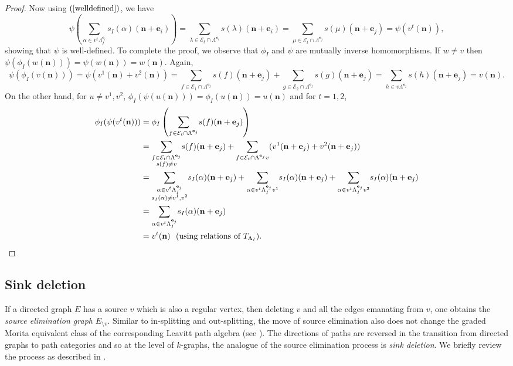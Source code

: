\documentclass[12pt]{amsart}
\newcommand{\N}{\mathbf{n}}
\theoremstyle{definition}
\theoremstyle{remark}
\begin{document}
\begin{proof}
Now using $(\ref{welldefined})$, we have \[\psi\left(\displaystyle{\sum_{\alpha\in v^t\Lambda_I^{\mathbf{e}_i}}} s_I(\alpha)(\N+\mathbf{e}_i)\right)=\displaystyle{\sum_{\lambda\in \mathcal{E}_t\cap \Lambda^{\mathbf{e}_i}}} s(\lambda)(\N+\mathbf{e}_i)=\displaystyle{\sum_{\mu\in \mathcal{E}_t\cap \Lambda^{\mathbf{e}_j}}} s(\mu)(\N+\mathbf{e}_j)=\psi(v^t(\N)),\] showing that $\psi$ is well-defined. To complete the proof, we observe that $\phi_I$ and $\psi$ are mutually inverse homomorphisms. If $w\neq v$ then $\psi(\phi_I(w(\N)))=\psi(w(\N))=w(\N)$. Again, \[\psi(\phi_I(v(\N)))=\psi(v^1(\N)+v^2(\N))=\displaystyle{\sum_{f\in \mathcal{E}_1\cap \Lambda^{\mathbf{e}_j}}} s(f)(\N+\mathbf{e}_j)+\displaystyle{\sum_{g\in \mathcal{E}_2\cap \Lambda^{\mathbf{e}_j}}} s(g)(\N+\mathbf{e}_j)=\displaystyle{\sum_{h\in v\Lambda^{\mathbf{e}_j}}} s(h)(\N+\mathbf{e}_j)=v(\N).\] On the other hand, for $u\neq v^1,v^2$, $\phi_I(\psi(u(\N)))=\phi_I(u(\N))=u(\N)$ and for $t=1,2$,
{\allowdisplaybreaks
\begin{align*}
\phi_I(\psi(v^t(\N)))&=\phi_I\left(\displaystyle{\sum_{f\in \mathcal{E}_t\cap \Lambda^{\mathbf{e}_j}}} s(f)(\N+\mathbf{e}_j)\right)\\
&= \displaystyle{\sum_{\substack{f\in \mathcal{E}_t\cap \Lambda^{\mathbf{e}_j}\\s(f)\neq v}}} s(f)(\N+\mathbf{e}_j)+\displaystyle{\sum_{f\in \mathcal{E}_t\cap \Lambda^{\mathbf{e}_j}v}} (v^1(\N+\mathbf{e}_j)+v^2(\N+\mathbf{e}_j))\\
&= \displaystyle{\sum_{\substack{\alpha\in v^t\Lambda_I^{\mathbf{e}_j}\\s_I(\alpha)\neq v^1,v^2}}} s_I(\alpha)(\N+\mathbf{e}_j)+\displaystyle{\sum_{\alpha\in v^t\Lambda_I^{\mathbf{e}_j}v^1}} s_I(\alpha)(\N+\mathbf{e}_j)+\displaystyle{\sum_{\alpha\in v^t\Lambda_I^{\mathbf{e}_j}v^2}} s_I(\alpha)(\N+\mathbf{e}_j)\\
&= \displaystyle{\sum_{\alpha\in v^t\Lambda_I^{\mathbf{e}_j}}} s_I(\alpha)(\N+\mathbf{e}_j)\\
&= v^t(\N)~~(\text{using relations of}~T_{\Lambda_I}).\qedhere
\end{align*}
}
\end{proof}

\subsection{Sink deletion}\label{ssec sink deletion}
If a directed graph $E$ has a source $v$ which is also a regular vertex, then deleting $v$ and all the edges emanating from $v$, one obtains the \emph{source elimination graph} $E_{\setminus v}$. Similar to in-splitting and out-splitting, the move of source elimination also does not change the graded Morita equivalent class of the corresponding Leavitt path algebra (see \cite[Proposition 13]{Hazrat-main}). The directions of paths are reversed in the transition from directed graphs to path categories and so at the level of $k$-graphs, the  analogue of the source elimination process is \emph{sink deletion}. We briefly review the process as described in \cite[Section 5]{EFGGGP}. 
\end{document}
